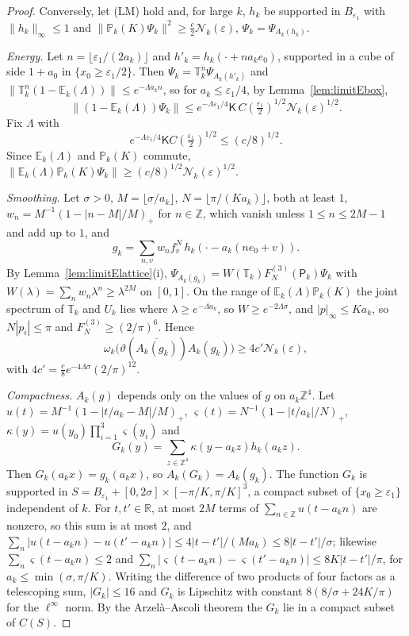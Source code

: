 \documentclass[aps,prd,twocolumn,superscriptaddress,nofootinbib,longbibliography,floatfix,amsmath,amssymb,10pt]{revtex4-2}
\theoremstyle{definition}
\theoremstyle{remark}
\newcommand{\R}{\mathbb{R}}
\newcommand{\Z}{\mathbb{Z}}
\begin{document}
\begin{proof}
Conversely, let (LM) hold and, for large $k$, $h_k$ be supported in
$B_{\varepsilon_1}$ with $\|h_k\|_\infty\le1$ and $\|\mathbb P_k(K)\Psi_k\|^2
\ge\frac c2\mathcal N_k(\varepsilon)$, $\Psi_k=\Psi_{A_k(h_k)}$.

\emph{Energy.} Let $n=\lfloor\varepsilon_1/(2a_k)\rfloor$ and $h'_k=h_k(
\cdot+na_ke_0)$, supported in a cube of side $1+a_0$ in $\{x_0\ge
\varepsilon_1/2\}$. Then $\Psi_k=\mathbb T_k^n\Psi_{A_k(h'_k)}$ and
$\|\mathbb T_k^n(1-\mathbb E_k(\Lambda))\|\le e^{-\Lambda a_kn}$, so for
$a_k\le\varepsilon_1/4$, by Lemma~\ref{lem:limitEbox},
\[
\|(1-\mathbb E_k(\Lambda))\Psi_k\|\le e^{-\Lambda\varepsilon_1/4}\mathsf K
\,C(\tfrac{\varepsilon_1}2)^{1/2}\mathcal N_k(\varepsilon)^{1/2} .
\]
Fix $\Lambda$ with
\[
e^{-\Lambda\varepsilon_1/4}\mathsf KC(\tfrac{\varepsilon_1}2)^{1/2}\le(c/8)^{1/2}.
\]
Since $\mathbb E_k(\Lambda)$ and $\mathbb P_k(K)$
commute, $\|\mathbb E_k(\Lambda)\mathbb P_k(K)\Psi_k\|\ge(c/8)^{1/2}
\mathcal N_k(\varepsilon)^{1/2}$.

\emph{Smoothing.} Let $\sigma>0$, $M=\lfloor\sigma/a_k\rfloor$, $N=
\lfloor\pi/(Ka_k)\rfloor$, both at least $1$, $w_n=M^{-1}(1-|n-M|/M)_+$ for
$n\in\Z$, which vanish unless $1\le n\le2M-1$ and add up to $1$, and
\[
g_k=\sum_{n,v}w_nf^N_v\,h_k(\cdot-a_k(ne_0+v)) .
\]
By Lemma~\ref{lem:limitElattice}(i), $\Psi_{A_k(g_k)}=W(\mathbb T_k)
F^{(3)}_N(\mathsf P_k)\Psi_k$ with $W(\lambda)=\sum_nw_n\lambda^n\ge
\lambda^{2M}$ on $[0,1]$. On the range of $\mathbb E_k(\Lambda)\mathbb
P_k(K)$ the joint spectrum of $\mathbb T_k$ and $U_k$ lies where
$\lambda\ge e^{-\Lambda a_k}$, so $W\ge e^{-2\Lambda\sigma}$, and
$|p|_\infty\le Ka_k$, so $N|p_i|\le\pi$ and $F^{(3)}_N\ge(2/\pi)^6$. Hence
\[
\omega_k\bigl(\vartheta(\overline{A_k(g_k)})A_k(g_k)\bigr)\ge4c'
\mathcal N_k(\varepsilon),
\]
with $4c'=\frac c8e^{-4\Lambda\sigma}(2/\pi)^{12}$.

\emph{Compactness.} $A_k(g)$ depends only on the values of $g$ on $a_k\Z^4$.
Let $u(t)=M^{-1}(1-|t/a_k-M|/M)_+$, $\varsigma(t)=N^{-1}(1-|t/a_k|/N)_+$,
$\kappa(y)=u(y_0)\prod_{i=1}^3\varsigma(y_i)$ and
\[
G_k(y)=\sum_{z\in\Z^4}\kappa(y-a_kz)h_k(a_kz) .
\]
Then $G_k(a_kx)=g_k(a_kx)$, so $A_k(G_k)=A_k(g_k)$. The function $G_k$ is supported in $S=B_{\varepsilon_1}+[0,
2\sigma]\times[-\pi/K,\pi/K]^3$, a compact subset of $\{x_0\ge
\varepsilon_1\}$ independent of $k$. For $t,t'\in\R$, at most $2M$ terms of
$\sum_{n\in\Z}u(t-a_kn)$ are nonzero, so this sum is at most $2$, and
$\sum_n|u(t-a_kn)-u(t'-a_kn)|\le4|t-t'|/(Ma_k)\le8|t-t'|/\sigma$; likewise
$\sum_n\varsigma(t-a_kn)\le2$ and $\sum_n|\varsigma(t-a_kn)-\varsigma(t'-
a_kn)|\le8K|t-t'|/\pi$, for $a_k\le\min(\sigma,\pi/K)$. Writing the
difference of two products of four factors as a telescoping sum, $|G_k|\le
16$ and $G_k$ is Lipschitz with constant $8(8/\sigma+24K/\pi)$ for the
$\ell^\infty$ norm. By the Arzel\`a--Ascoli theorem the $G_k$ lie in a
compact subset of $C(S)$.


\end{proof}
\end{document}
